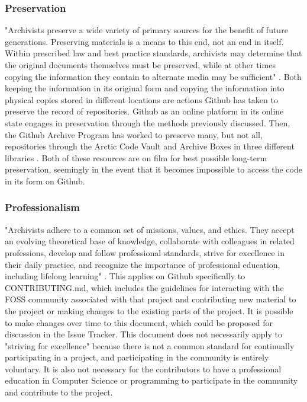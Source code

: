 \subsubsection{Preservation}

"Archivists preserve a wide variety of primary sources for the benefit of future generations. Preserving materials is a means to this end, not an end in itself. Within prescribed law and best practice standards, archivists may determine that the original documents themselves must be preserved, while at other times copying the information they contain to alternate media may be sufficient" \cite{rubin2016foundationslis}. Both keeping the information in its original form and copying the information into physical copies stored in different locations are actions Github has taken to preserve the record of repositories. Github as an online platform in its online state engages in preservation through the methods previously discussed. Then, the Github Archive Program has worked to preserve many, but not all, repositories through the Arctic Code Vault and Archive Boxes in three different libraries \cite{arcticcodevault}\cite{githubarchiveboxes}. Both of these resources are on film for best possible long-term preservation, seemingly in the event that it becomes impossible to access the code in its form on Github\cite{arcticcodevault}\cite{githubarchiveboxes}. 

\subsubsection{Professionalism}

"Archivists adhere to a common set of missions, values, and ethics. They accept an evolving theoretical base of knowledge, collaborate with colleagues in related professions, develop and follow professional standards, strive for excellence in their daily practice, and recognize the importance of professional education, including lifelong learning" \cite{rubin2016foundationslis}. This applies on Github specifically to CONTRIBUTING.md, which includes the guidelines for interacting with the FOSS community associated with that project and contributing new material to the project or making changes to the existing parts of the project. It is possible to make changes over time to this document, which could be proposed for discussion in the Issue Tracker. This document does not necessarily apply to "striving for excellence" because there is not a common standard for continually participating in a project, and participating in the community is entirely voluntary. It is also not necessary for the contributors to have a professional education in Computer Science or programming to participate in the community and contribute to the project.

